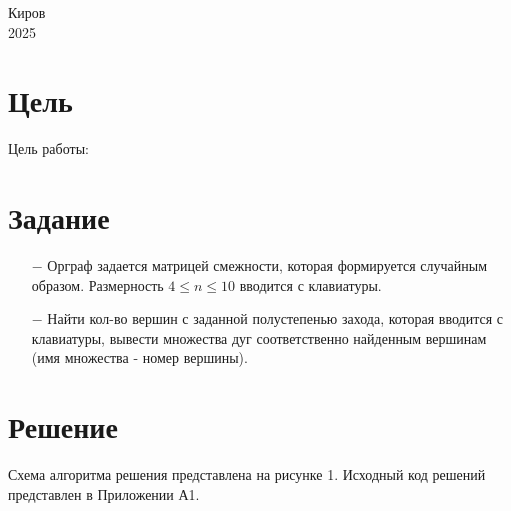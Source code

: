 \documentclass[oneside,a4paper,14pt]{extarticle}
\begin{document}
\begin{center}
	Киров\\
	2025
\end{center}

\newpage\thispagestyle{plain}

\section*{Цель}

Цель работы: 

\section*{Задание}
\begin{itemize}
	\item[$-$] Орграф задается матрицей смежности, которая формируется случайным образом. Размерность $ 4 \leq n \leq 10 $ вводится с клавиатуры.
  \item[$-$] Найти кол-во вершин с заданной полустепенью захода, которая вводится с клавиатуры, вывести множества дуг соответственно найденным вершинам (имя множества - номер вершины).
\end{itemize}
\section*{Решение}

Схема алгоритма решения представлена на рисунке 1. Исходный код решений представлен в Приложении А1.
\end{document}
